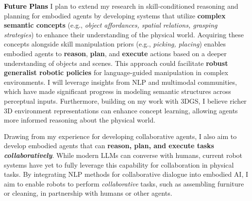 \documentclass[10pt]{article}
\newcommand{\statement}[1]{\medskip\noindent
  \textcolor{black}{\textbf{#1}}\space
}
\newif\ifcomments
\newcommand{\todo}[1]{\ifcomments\textcolor{red}{TODO: #1}\fi}
\begin{document}
\statement{Future Plans} I plan to extend my research in skill-conditioned reasoning and planning for embodied agents by developing systems that utilize \textbf{complex semantic concepts} (e.g., \textit{object affordances, spatial relations, grasping strategies}) to enhance their understanding of the physical world. Acquiring these concepts alongside skill manipulation priors (e.g., \textit{picking, placing}) enables embodied agents to \textbf{reason}, \textbf{plan}, and \textbf{execute} actions based on a deeper understanding of objects and scenes. This approach could facilitate \textbf{robust generalist robotic policies} for language-guided manipulation in complex environments. I will leverage insights from NLP and multimodal communities, which have made significant progress in modeling semantic structures across perceptual inputs. Furthermore, building on my work with 3DGS, I believe richer 3D environment representations can enhance concept learning, allowing agents more informed reasoning about the physical world.

\noindent Drawing from my experience for developing collaborative agents, I also aim to develop embodied agents that can \textbf{reason, plan, and execute tasks \textit{collaboratively}}. While modern LLMs can converse with humans, current robot systems have yet to fully leverage this capability for collaboration in physical tasks. By integrating NLP methods for collaborative dialogue into embodied AI, I aim to enable robots to perform \textit{collaborative} tasks, such as assembling furniture or cleaning, in partnership with humans or other agents.

\statement{\todo{Why School}}
\end{document}
